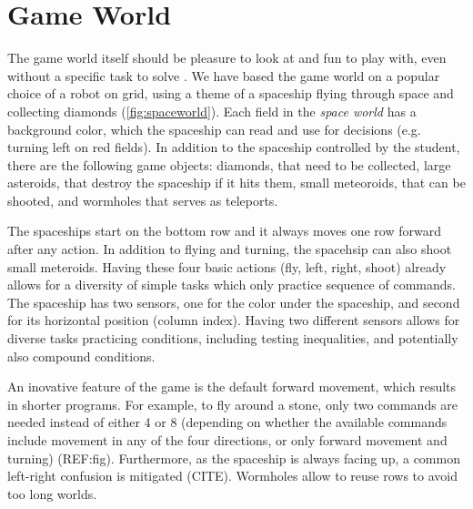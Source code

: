 

\section{Game World}  %
\label{sec:robomission.game-world}

The game world itself should be pleasure to look at and fun to play with,
even without a specific task to solve \cite{book-of-lenses}.
We have based the game world on a popular choice of a robot on grid,
using a theme of a spaceship flying through space and collecting diamonds
(\cref{fig:spaceworld}).
Each field in the \emph{space world} has a background color, which
the spaceship can read and use for decisions (e.g. turning left on red fields).
In addition to the spaceship controlled by the student,
there are the following game objects:
diamonds, that need to be collected,
large asteroids, that destroy the spaceship if it hits them,
small meteoroids, that can be shooted,
and wormholes that serves as teleports.

The spaceships start on the bottom row and it always moves one row forward
after any action. %
In addition to flying and turning, the spacehsip can also shoot small meteroids.
Having these four basic actions (fly, left, right, shoot) already allows for a
diversity of simple tasks which only practice sequence of commands.
The spaceship has two sensors, one for the color under the spaceship, and
second for its horizontal position (column index). Having two different sensors allows
for diverse tasks practicing conditions, including testing inequalities, and
potentially also compound conditions.

An inovative feature of the game is the default forward movement,
which results in shorter programs.
For example, to fly around a stone, only two commands are needed %
instead of either 4 or 8 (depending on whether the available commands include
movement in any of the four directions, or only forward movement and turning)
(REF:fig).
Furthermore, as the spaceship is always facing up, a common left-right
confusion is mitigated (CITE).
Wormholes allow to reuse rows to avoid too long worlds.  %


